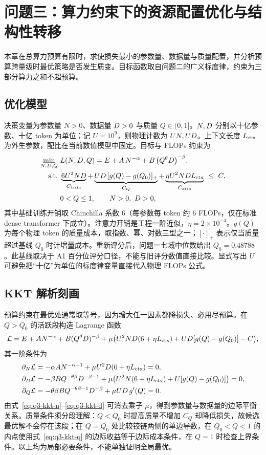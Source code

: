 \section{问题三：算力约束下的资源配置优化与结构性转移}

本章在总算力预算有限时，求使损失最小的参数量、数据量与质量配置，并分析预算跨量级时最优策略是否发生质变。目标函数取自问题二的广义标度律，约束为三部分算力之和不超预算。

\subsection{优化模型}
决策变量为参数量 $N>0$、数据量 $D>0$ 与质量 $Q\in(0,1]$。$N,D$ 分别以十亿参数、十亿 token 为单位；记 $U=10^9$，则物理计数为 $UN,UD$。上下文长度 $L_{\mathrm{ctx}}$ 为外生参数，配比在当前数值模型中固定。目标与 FLOPs 约束为
\begin{align}
\min_{N,D,Q}\ & L(N,D,Q)=E+A\,N^{-\alpha}+B\,\bigl(Q^{\theta}D\bigr)^{-\beta},
\label{eq:q3-obj}\\
\text{s.t.}\ & \underbrace{6U^2ND}_{C_{\mathrm{train}}}
+\underbrace{UD\,[g(Q)-g(Q_0)]_+}_{C_Q}
+\underbrace{\eta U^2NDL_{\mathrm{ctx}}}_{C_{\mathrm{attn}}}\ \le\ C,
\label{eq:q3-budget}\\
& 0<Q\le 1,\qquad N>0,\ D>0,
\label{eq:q3-dom}
\end{align}
其中基础训练开销取 Chinchilla 系数 $6$（每参数每 token 约 $6$ FLOPs，仅在标准 dense transformer 下成立）。注意力开销是工程一阶近似，$\eta=2\times10^{-4}$。$g(Q)$ 为每个物理 token 的质量成本，取指数、幂、对数三型之一；$[\cdot]_+$ 表示仅当质量超过基线 $Q_0$ 时计增量成本。重新评分后，问题一七域中位数给出 $Q_0=0.48788$。此基线取决于 A1 百分位评分口径，不能与旧评分数值直接比较。显式写出 $U$ 可避免把“十亿”为单位的标度律变量直接代入物理 FLOPs 公式。

\subsection{KKT 解析刻画}
预算约束在最优处通常取等号，因为增大任一因素都降损失、必用尽预算。在 $Q>Q_0$ 的活跃段构造 Lagrange 函数
\begin{equation}
\mathcal L=E+A N^{-\alpha}+B(Q^{\theta}D)^{-\beta}
+\mu\bigl(U^2ND(6+\eta L_{\mathrm{ctx}})+UD[g(Q)-g(Q_0)]-C\bigr),
\label{eq:q3-lagr}
\end{equation}
其一阶条件为
\begin{align}
\partial_N\mathcal L&=-\alpha A N^{-\alpha-1}+\mu U^2D(6+\eta L_{\mathrm{ctx}})=0,
\label{eq:q3-kkt-n}\\
\partial_D\mathcal L&=-\beta B Q^{-\theta\beta}D^{-\beta-1}
+\mu\bigl(U^2N(6+\eta L_{\mathrm{ctx}})+U[g(Q)-g(Q_0)]\bigr)=0,
\label{eq:q3-kkt-d}\\
\partial_Q\mathcal L&=-\theta\beta B Q^{-\theta\beta-1}D^{-\beta}
+\mu UD\,g'(Q)=0 .
\label{eq:q3-kkt-q}
\end{align}
由式~\eqref{eq:q3-kkt-n}--\eqref{eq:q3-kkt-d} 可消去乘子 $\mu$，得到参数量与数据量的边际平衡关系\cite{hoffmann2022}。质量条件须分段理解：$Q<Q_0$ 时提高质量不增加 $C_Q$ 却降低损失，故候选最优解不会停在该段；在 $Q=Q_0$ 处比较铰链两侧的单边导数，在 $Q_0<Q<1$ 的内点使用式~\eqref{eq:q3-kkt-q} 的边际收益等于边际成本条件，在 $Q=1$ 时检查上界条件。以上均为局部必要条件，不能单独证明全局最优。

